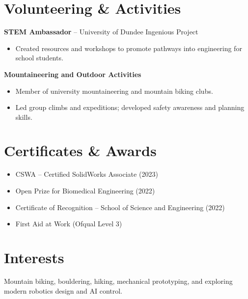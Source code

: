\documentclass[a4paper,11pt]{article}
\begin{document}
\section*{Volunteering \& Activities}

\textbf{STEM Ambassador} – University of Dundee Ingenious Project
\begin{itemize}
    \item Created resources and workshops to promote pathways into engineering for school students.
\end{itemize}

\textbf{Mountaineering and Outdoor Activities}
\begin{itemize}
    \item Member of university mountaineering and mountain biking clubs.
    \item Led group climbs and expeditions; developed safety awareness and planning skills.
\end{itemize}

\section*{Certificates \& Awards}
\begin{itemize}
    \item CSWA – Certified SolidWorks Associate (2023)
    \item Open Prize for Biomedical Engineering (2022)
    \item Certificate of Recognition – School of Science and Engineering (2022)
    \item First Aid at Work (Ofqual Level 3)
\end{itemize}

\section*{Interests}
Mountain biking, bouldering, hiking, mechanical prototyping, and exploring modern robotics design and AI control.
\end{document}
